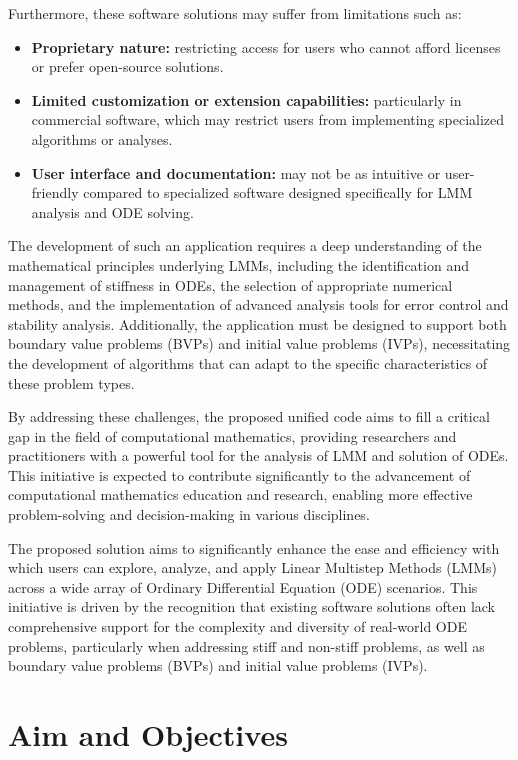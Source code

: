 \documentclass[a4paper, twoside]{report} %
\begin{document}
	Furthermore, these software solutions may suffer from limitations such as:

	\begin{itemize}
		\item \textbf{Proprietary nature:} restricting access for users who cannot afford licenses or prefer open-source solutions.
		\item \textbf{Limited customization or extension capabilities:} particularly in commercial software, which may restrict users from implementing specialized algorithms or analyses.
		\item \textbf{User interface and documentation:} may not be as intuitive or user-friendly compared to specialized software designed specifically for LMM analysis and ODE solving.
	\end{itemize}

	The development of such an application requires a deep understanding of the mathematical principles underlying LMMs, including the identification and management of stiffness in ODEs, the selection of appropriate numerical methods, and the implementation of advanced analysis tools for error control and stability analysis. Additionally, the application must be designed to support both boundary value problems (BVPs) and initial value problems (IVPs), necessitating the development of algorithms that can adapt to the specific characteristics of these problem types.

	By addressing these challenges, the proposed unified code aims to fill a critical gap in the field of computational mathematics, providing researchers and practitioners with a powerful tool for the analysis of LMM and solution of ODEs. This initiative is expected to contribute significantly to the advancement of computational mathematics education and research, enabling more effective problem-solving and decision-making in various disciplines.

	The proposed solution aims to significantly enhance the ease and efficiency with which users can explore, analyze, and apply Linear Multistep Methods (LMMs) across a wide array of Ordinary Differential Equation (ODE) scenarios. This initiative is driven by the recognition that existing software solutions often lack comprehensive support for the complexity and diversity of real-world ODE problems, particularly when addressing stiff and non-stiff problems, as well as boundary value problems (BVPs) and initial value problems (IVPs).


	\section{Aim and Objectives}
\end{document}

